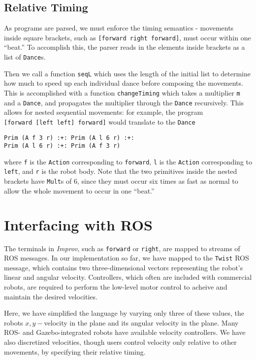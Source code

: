 \documentclass[sigconf]{acmart}
\begin{document}
\subsection{Relative Timing}\label{relative-timing}

As programs are parsed, we must enforce the timing semantics - movements
inside square brackets, such as \texttt{{[}forward\ right\ forward{]}},
must occur within one ``beat.'' To accomplish this, the parser reads in
the elements inside brackets as a list of \texttt{Dance}s.

Then we call a function \texttt{seqL} which uses the length of the
initial list to determine how much to speed up each individual dance
before composing the movements. This is accomplished with a function
\texttt{changeTiming} which takes a multiplier \texttt{m} and a
\texttt{Dance}, and propagates the multiplier through the \texttt{Dance}
recursively. This allows for nested sequential movements: for example,
the program \texttt{{[}forward\ {[}left\ left{]}\ forward{]}} would
translate to the \texttt{Dance}

\begin{verbatim}
Prim (A f 3 r) :+: Prim (A l 6 r) :+: 
Prim (A l 6 r) :+: Prim (A f 3 r)
\end{verbatim}

where \texttt{f} is the \texttt{Action} corresponding to
\texttt{forward}, \texttt{l} is the \texttt{Action} corresponding to
\texttt{left}, and \texttt{r} is the robot body. Note that the two
primitives inside the nested brackets have \texttt{Mult}s of 6, since
they must occur six times as fast as normal to allow the whole movement
to occur in one ``beat.''

\section{Interfacing with ROS}\label{interfacing-with-ros}

The terminals in \emph{Improv}, such as \texttt{forward} or
\texttt{right}, are mapped to streams of ROS messages. In our
implementation so far, we have mapped to the \texttt{Twist} ROS message,
which contains two three-dimensional vectors
representing the robot's linear and angular velocity. Controllers, which often
are included with commercial robots, are required to perform the low-level motor
control to acheive and maintain the desired velocities.

Here, we have simplified the language
by varying only three of these values, the robots \(x,y-\)velocity in
the plane and its angular velocity in the plane. Many ROS- and
Gazebo-integrated robots have available velocity controllers. We have
also discretized velocities, though users control velocity only relative
to other movements, by specifying their relative timing.
\end{document}
